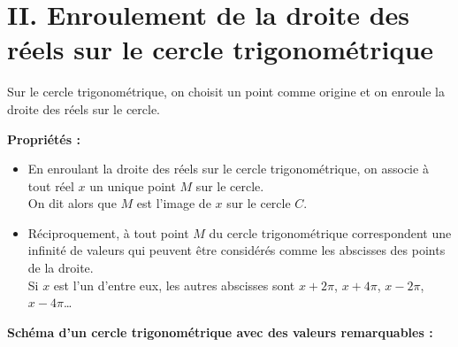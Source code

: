 \documentclass[11pt,a4paper]{article}
\begin{document}
\newpage

\section*{II. Enroulement de la droite des réels sur le cercle trigonométrique}

Sur le cercle trigonométrique, on choisit un point comme origine et on enroule la droite des réels sur le cercle.

\begin{center}
\end{center}

\begin{mdframed}[style=proprieteStyle]
    \textbf{Propriétés :}
    \vspace{-4pt}
    \begin{itemize}
        \item En enroulant la droite des réels sur le cercle trigonométrique, on associe à tout réel $x$ un unique point $M$ sur le cercle. \\
              On dit alors que $M$ est l'image de $x$ sur le cercle $C$.
        \item Réciproquement, à tout point $M$ du cercle trigonométrique correspondent une infinité de valeurs qui peuvent être considérés comme les abscisses des points de la droite. \\
              Si $x$ est l'un d'entre eux, les autres abscisses sont $x+2\pi$, $x+4\pi$, $x-2\pi$, $x-4\pi$\dots
    \end{itemize}
\end{mdframed}

\textbf{Schéma d'un cercle trigonométrique avec des valeurs remarquables :}
\end{document}
